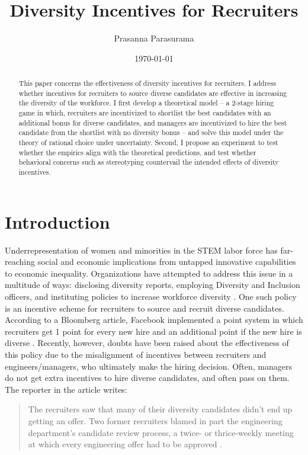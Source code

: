 \documentclass[11pt]{article}
\begin{document}
\title{Diversity Incentives for Recruiters}
\author{Prasanna Parasurama}
\date{\today}
\maketitle

\begin{abstract}
    This paper concerns the effectiveness of diversity incentives for recruiters. I address whether incentives for recruiters to source diverse candidates are effective in increasing the diversity of the workforce. I first develop a theoretical model --  a 2-stage hiring game in which, recruiters are incentivized to shortlist the best candidates with an additional bonus for diverse candidates, and managers are incentivized to hire the best candidate from the shortlist with no diversity bonus -- and solve this model under the theory of rational choice under uncertainty. Second, I propose an experiment to test whether the empirics align with the theoretical predictions, and test whether behavioral concerns such as stereotyping countervail the intended effects of diversity incentives.
\end{abstract}

\section{Introduction}
Underrepresentation of women and minorities in the STEM labor force has far-reaching social and economic implications from untapped innovative capabilities to economic inequality. Organizations have attempted to address this issue in a multitude of ways: disclosing diversity reports, employing Diversity and Inclusion officers, and instituting policies to increase workforce diversity \parencite{shi_adoption_2018}. One such policy is an incentive scheme for recruiters to source and recruit diverse candidates. According to a Bloomberg article, Facebook implemented a point system in which recruiters get 1 point for every new hire and an additional point if the new hire is diverse \parencite{huet_facebooks_2017}. Recently, however, doubts have been raised about the effectiveness of this policy due to the misalignment of incentives between recruiters and engineers/managers, who ultimately make the hiring decision. Often, managers do not get extra incentives to hire diverse candidates, and often pass on them. The reporter in the article writes:
\begin{quote}
    The recruiters saw that many of their diversity candidates didn’t end up getting an offer. Two former recruiters blamed in part the engineering department’s candidate review process, a twice- or thrice-weekly meeting at which every engineering offer had to be approved \parencite{huet_facebooks_2017}.
\end{quote}
\end{document}
